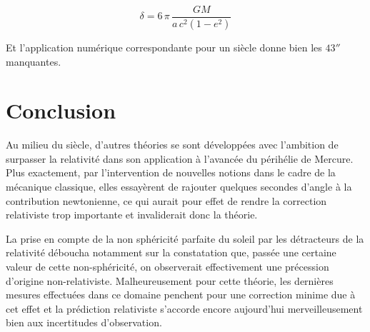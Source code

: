 \documentclass[12pt,a4paper]{article}
\newcommand{\pa}[1]{\left(#1\right)}
\begin{document}
\begin{equation}
    \boxed{
    \delta = 6\, \pi \, \frac{G M}{a\, c^2\pa{1-e^2}}
    }
\end{equation}

    Et l'application numérique correspondante pour un siècle donne
bien les $43''$ manquantes.

\section{Conclusion}

    Au milieu du siècle, d'autres théories se sont développées 
avec l'ambition de surpasser la relativité dans son application à
l'avancée du périhélie de Mercure. Plus exactement, par
l'intervention de nouvelles notions dans le cadre de la mécanique
classique, elles essayèrent de rajouter quelques secondes d'angle à la
contribution newtonienne, ce qui aurait pour effet de rendre la correction
relativiste trop importante et invaliderait donc la théorie.

La prise en compte de la non sphéricité parfaite du soleil par les
détracteurs de la relativité déboucha notamment sur la constatation
que, passée une certaine valeur de cette non-sphéricité, on
observerait effectivement une précession d'origine non-relativiste.
Malheureusement pour cette théorie, les dernières mesures effectuées
dans ce domaine penchent pour une correction minime due à cet effet et
la prédiction relativiste s'accorde encore aujourd'hui merveilleusement
bien aux incertitudes d'observation.

\end{document}

